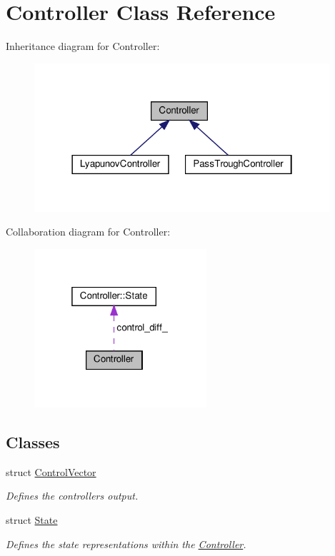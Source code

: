 \hypertarget{classController}{}\section{Controller Class Reference}
\label{classController}


Inheritance diagram for Controller\+:\nopagebreak
\begin{figure}[H]
\begin{center}
\leavevmode
\includegraphics[width=310pt]{dc/d30/classController__inherit__graph}
\end{center}
\end{figure}


Collaboration diagram for Controller\+:\nopagebreak
\begin{figure}[H]
\begin{center}
\leavevmode
\includegraphics[width=181pt]{dd/d93/classController__coll__graph}
\end{center}
\end{figure}
\subsection*{Classes}
\begin{DoxyCompactItemize}
\item 
struct \hyperlink{structController_1_1ControlVector}{Control\+Vector}
\begin{DoxyCompactList}\small\item\em Defines the controllers output. \end{DoxyCompactList}\item 
struct \hyperlink{structController_1_1State}{State}
\begin{DoxyCompactList}\small\item\em Defines the state representations within the \hyperlink{classController}{Controller}. \end{DoxyCompactList}\end{DoxyCompactItemize}
